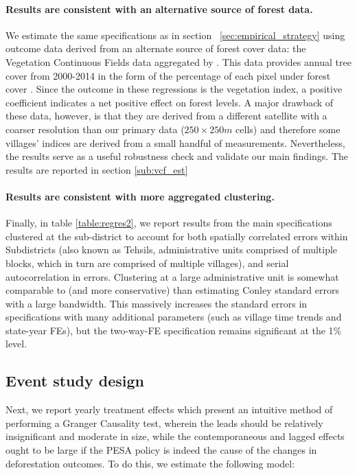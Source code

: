 \documentclass[12pt,reqno]{article}
\begin{document}
\paragraph*{Results are consistent with an alternative source of forest data.} We estimate the same specifications as in section ~\ref{sec:empirical_strategy} using outcome data derived from an alternate source of forest cover data: the Vegetation Continuous Fields data aggregated by \textcite{almn2019}. This data provides annual tree cover from 2000-2014 in the form of the percentage of each pixel under forest cover \parencite{Sexton2013-xx}. Since the outcome in these regressions is the vegetation index, a positive coefficient indicates a net positive effect on forest levels. A major drawback of these data, however, is that they are derived from a different satellite with a coarser resolution than our primary data ($250\times250m$ cells) and therefore some villages' indices are derived from a small handful of measurements. Nevertheless, the results serve as a useful robustness check and validate our main findings. The results are reported in section \ref{sub:vcf_est}


\paragraph*{Results are consistent with more aggregated clustering.}
Finally, in table \ref{table:regres2}, we report results from the main specifications clustered at the sub-district to account for both spatially correlated errors within Subdistricts (also known as Tehsils, administrative units comprised of multiple blocks, which in turn are comprised of multiple villages), and serial autocorrelation in errors. Clustering at a large administrative unit is somewhat comparable to (and more conservative) than estimating Conley standard errors with a large bandwidth. This massively increases the standard errors in specifications with many additional parameters (such as village time trends and state-year FEs), but the two-way-FE specification remains significant at the 1\% level.




\subsection{Event study design} %
\label{sub:dynamic_treatment_effects}

Next, we report yearly treatment effects which present an intuitive method of performing a Granger Causality test, wherein the leads should be relatively insignificant and moderate in size, while the contemporaneous and lagged effects ought to be large if the PESA policy is indeed the cause of the changes in deforestation outcomes. To do this, we estimate the following model:
\end{document}
